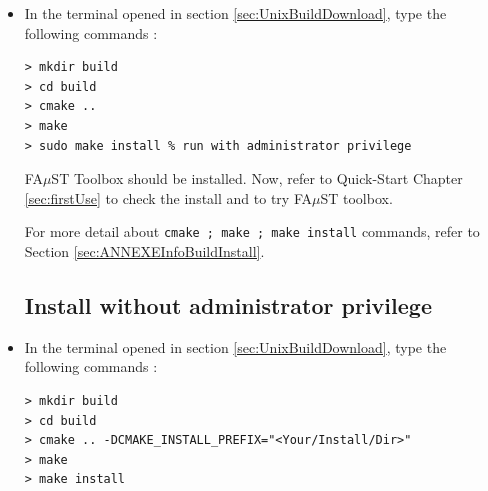 \begin{itemize}
\section{Basic Build \& Installation using Makefile}\label{sec:UnixBuildInstall}

\paragraph{}When you have done the step in section  \ref{sec:UnixBuildDownload} (i.e download Faust package and launch the terminal in the right directory),  the FA$\mu$ST installation can start.
If you are administrator of your machine (root access), follow instructions given in Section \ref{sec:UnixBuildInstallAdmin}. Otherwise, for local installation, refer to Section \ref{sec:UnixBuildInstallNOAdmin}. 

\subsection{Install with administrator privilege}\label{sec:UnixBuildInstallAdmin}
\item In the terminal opened in section 
\ref{sec:UnixBuildDownload}, type the following commands : 
\begin{itemize}
\begin{lstlisting}
> mkdir build
> cd build
> cmake ..
> make
> sudo make install % run with administrator privilege
\end{lstlisting}
\end{itemize}

FA$\mu$ST Toolbox should be installed. Now, refer to Quick-Start Chapter \ref{sec:firstUse} to check the install and to try FA$\mu$ST toolbox.

For more detail about \texttt{cmake ; make ; make install} commands, refer to Section \ref{sec:ANNEXEInfoBuildInstall}.


\subsection{Install without administrator privilege}\label{sec:UnixBuildInstallNOAdmin}
\item In the terminal opened in section 
\ref{sec:UnixBuildDownload}, type the following commands :
\begin{lstlisting}
> mkdir build
> cd build
> cmake .. -DCMAKE_INSTALL_PREFIX="<Your/Install/Dir>"
> make
> make install
\end{lstlisting}
\end{itemize}

